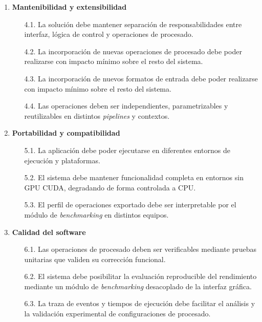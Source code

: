 \begin{enumerate}[leftmargin=15pt]
	\newpage

	\item \textbf{Mantenibilidad y extensibilidad}\label{req:rnf-4}
	\begin{enumerate}
		\item[4.1.] La solución debe mantener separación de responsabilidades entre interfaz, lógica de control y operaciones de procesado.\label{req:rnf-4-1}
		\item[4.2.] La incorporación de nuevas operaciones de procesado debe poder realizarse con impacto mínimo sobre el resto del sistema.\label{req:rnf-4-2}
		\item[4.3.] La incorporación de nuevos formatos de entrada debe poder realizarse con impacto mínimo sobre el resto del sistema.\label{req:rnf-4-3}
		\item[4.4.] Las operaciones deben ser independientes, parametrizables y reutilizables en distintos \textit{pipelines} y contextos.\label{req:rnf-4-4}
	\end{enumerate}

	\vspace{0.5em}

	\item \textbf{Portabilidad y compatibilidad}\label{req:rnf-5}
	\begin{enumerate}
		\item[5.1.] La aplicación debe poder ejecutarse en diferentes entornos de ejecución y plataformas.\label{req:rnf-5-1}
		\item[5.2.] El sistema debe mantener funcionalidad completa en entornos sin GPU CUDA, degradando de forma controlada a CPU.\label{req:rnf-5-2}
		\item[5.3.] El perfil de operaciones exportado debe ser interpretable por el módulo de \textit{benchmarking} en distintos equipos.\label{req:rnf-5-3}
	\end{enumerate}

	\vspace{0.5em}

	\item \textbf{Calidad del software}\label{req:rnf-6}
	\begin{enumerate}
		\item[6.1.] Las operaciones de procesado deben ser verificables mediante pruebas unitarias que validen su corrección funcional.\label{req:rnf-6-1}
		\item[6.2.] El sistema debe posibilitar la evaluación reproducible del rendimiento mediante un módulo de \textit{benchmarking} desacoplado de la interfaz gráfica.\label{req:rnf-6-2}
		\item[6.3.] La traza de eventos y tiempos de ejecución debe facilitar el análisis y la validación experimental de configuraciones de procesado.\label{req:rnf-6-3}
	\end{enumerate}
\end{enumerate}

